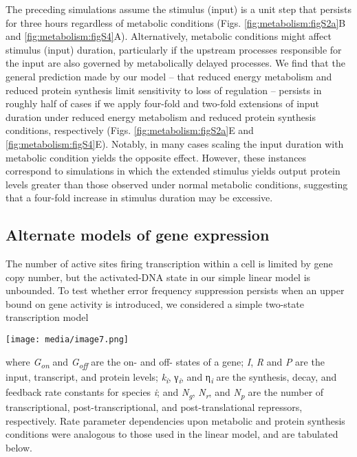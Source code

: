 The preceding simulations assume the stimulus (input) is a unit step that persists for three hours regardless of metabolic conditions (Figs. \ref{fig:metabolism:figS2a}B and \ref{fig:metabolism:figS4}A). Alternatively, metabolic conditions might affect stimulus (input) duration, particularly if the upstream processes responsible for the input are also governed by metabolically delayed processes. We find that the general prediction made by our model -- that reduced energy metabolism and reduced protein synthesis limit sensitivity to loss of regulation -- persists in roughly half of cases if we apply four-fold and two-fold extensions of input duration under reduced energy metabolism and reduced protein synthesis conditions, respectively (Figs. \ref{fig:metabolism:figS2a}E and \ref{fig:metabolism:figS4}E). Notably, in many cases scaling the input duration with metabolic condition yields the opposite effect. However, these instances correspond to simulations in which the extended stimulus yields output protein levels greater than those observed under normal metabolic conditions, suggesting that a four-fold increase in stimulus duration may be excessive.






\subsection{Alternate models of gene expression}
\label{appendix:methods:metabolism:alternate_models}

The number of active sites firing transcription within a cell is limited by gene copy number, but the activated-DNA state in our simple linear model is unbounded. To test whether error frequency suppression persists when an upper bound on gene activity is introduced, we considered a simple two-state transcription model

\texttt{[image: media/image7.png]}

where \textit{G\textsubscript{on}} and \textit{G\textsubscript{off}} are the on- and off- states of a gene; \textit{I}, \textit{R} and \textit{P} are the input, transcript, and protein levels; \textit{k\textsubscript{i}}, γ\textit{\textsubscript{i}}, and η\textit{\textsubscript{i}} are the synthesis, decay, and feedback rate constants for species \textit{i}; and \textit{N\textsubscript{g}}, \textit{N\textsubscript{r}}, and \textit{N\textsubscript{p}} are the number of transcriptional, post-transcriptional, and post-translational repressors, respectively. Rate parameter dependencies upon metabolic and protein synthesis conditions were analogous to those used in the linear model, and are tabulated below.

